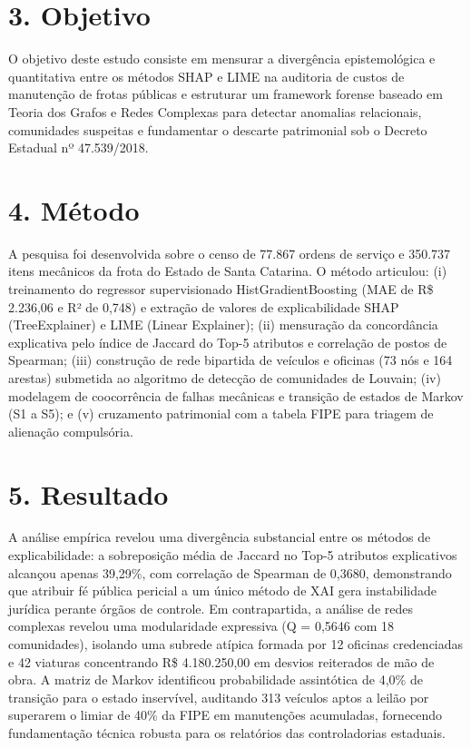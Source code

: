 \documentclass[10pt,a4paper,journal]{article}
\begin{document}
\section{3. Objetivo}
O objetivo deste estudo consiste em mensurar a divergência epistemológica e quantitativa entre os métodos SHAP e LIME na auditoria de custos de manutenção de frotas públicas e estruturar um framework forense baseado em Teoria dos Grafos e Redes Complexas para detectar anomalias relacionais, comunidades suspeitas e fundamentar o descarte patrimonial sob o Decreto Estadual nº 47.539/2018.

\section{4. Método}
A pesquisa foi desenvolvida sobre o censo de 77.867 ordens de serviço e 350.737 itens mecânicos da frota do Estado de Santa Catarina. O método articulou: (i) treinamento do regressor supervisionado HistGradientBoosting (MAE de R\$ 2.236,06 e R² de 0,748) e extração de valores de explicabilidade SHAP (TreeExplainer) e LIME (Linear Explainer); (ii) mensuração da concordância explicativa pelo índice de Jaccard do Top-5 atributos e correlação de postos de Spearman; (iii) construção de rede bipartida de veículos e oficinas (73 nós e 164 arestas) submetida ao algoritmo de detecção de comunidades de Louvain; (iv) modelagem de coocorrência de falhas mecânicas e transição de estados de Markov (S1 a S5); e (v) cruzamento patrimonial com a tabela FIPE para triagem de alienação compulsória.

\section{5. Resultado}
A análise empírica revelou uma divergência substancial entre os métodos de explicabilidade: a sobreposição média de Jaccard no Top-5 atributos explicativos alcançou apenas 39,29\%, com correlação de Spearman de 0,3680, demonstrando que atribuir fé pública pericial a um único método de XAI gera instabilidade jurídica perante órgãos de controle. Em contrapartida, a análise de redes complexas revelou uma modularidade expressiva (Q = 0,5646 com 18 comunidades), isolando uma subrede atípica formada por 12 oficinas credenciadas e 42 viaturas concentrando R\$ 4.180.250,00 em desvios reiterados de mão de obra. A matriz de Markov identificou probabilidade assintótica de 4,0\% de transição para o estado inservível, auditando 313 veículos aptos a leilão por superarem o limiar de 40\% da FIPE em manutenções acumuladas, fornecendo fundamentação técnica robusta para os relatórios das controladorias estaduais.
\end{document}

